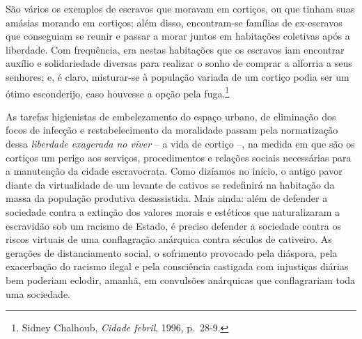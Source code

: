 São vários os exemplos de escravos que moravam em cortiços, ou que
tinham suas amásias morando em cortiços; além disso, encontram-se
famílias de ex-escravos que conseguiam se reunir e passar a morar juntos
em habitações coletivas após a liberdade. Com frequência, era nestas
habitações que os escravos iam encontrar auxílio e solidariedade
diversas para realizar o sonho de comprar a alforria a seus senhores; e,
é claro, misturar-se à população variada de um cortiço podia ser um
ótimo esconderijo, caso houvesse a opção pela fuga.\footnote{Sidney
  Chalhoub, \emph{Cidade febril}, 1996, p.~28-9.}

As tarefas higienistas de embelezamento do espaço urbano, de eliminação
dos focos de infecção e restabelecimento da moralidade passam pela
normatização dessa \emph{liberdade exagerada no viver} -- a vida de
cortiço --, na medida em que são os cortiços um perigo aos serviços,
procedimentos e relações sociais necessárias para a manutenção da cidade
escravocrata. Como dizíamos no início, o antigo pavor diante da
virtualidade de um levante de cativos se redefinirá na habitação da
massa da população produtiva desassistida. Mais ainda: além de defender
a sociedade contra a extinção dos valores morais e estéticos que
naturalizaram a escravidão sob um racismo de Estado, é preciso defender
a sociedade contra os riscos virtuais de uma conflagração anárquica
contra séculos de cativeiro. As gerações de distanciamento social, o
sofrimento provocado pela diáspora, pela exacerbação do racismo ilegal e
pela consciência castigada com injustiças diárias bem poderiam eclodir,
amanhã, em convulsões anárquicas que conflagrariam toda uma sociedade.

